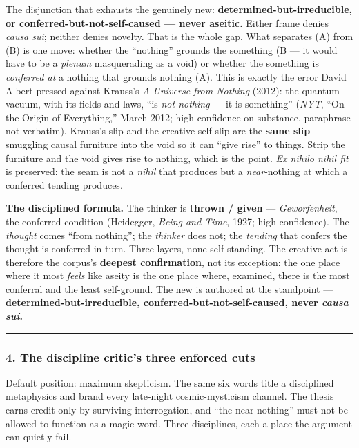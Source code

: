 \documentclass[11pt]{article}
\begin{document}
The disjunction that exhausts the genuinely new: \textbf{determined-but-irreducible, or conferred-but-not-self-caused — never aseitic.} Either frame denies \emph{causa sui}; neither denies novelty. That is the whole gap. What separates (A) from (B) is one move: whether the ``nothing'' grounds the something (B — it would have to be a \emph{plenum} masquerading as a void) or whether the something is \emph{conferred at} a nothing that grounds nothing (A). This is exactly the error David Albert pressed against Krauss's \emph{A Universe from Nothing} (2012): the quantum vacuum, with its fields and laws, ``is \emph{not nothing} — it is something'' (\emph{NYT}, ``On the Origin of Everything,'' March 2012; high confidence on substance, paraphrase not verbatim). Krauss's slip and the creative-self slip are the \textbf{same slip} — smuggling causal furniture into the void so it can ``give rise'' to things. Strip the furniture and the void gives rise to nothing, which is the point. \emph{Ex nihilo nihil fit} is preserved: the seam is not a \emph{nihil} that produces but a \emph{near}-nothing at which a conferred tending produces.

\textbf{The disciplined formula.} The thinker is \textbf{thrown /\allowbreak{} given} — \emph{Geworfenheit}, the conferred condition (Heidegger, \emph{Being and Time}, 1927; high confidence). The \emph{thought} comes ``from nothing''; the \emph{thinker} does not; the \emph{tending} that confers the thought is conferred in turn. Three layers, none self-standing. The creative act is therefore the corpus's \textbf{deepest confirmation}, not its exception: the one place where it most \emph{feels} like aseity is the one place where, examined, there is the most conferral and the least self-ground. The new is authored at the standpoint — \textbf{determined-but-irreducible, conferred-but-not-self-caused, never \emph{causa sui}.}

\medskip\noindent\rule{\linewidth}{0.3pt}\medskip

\subsubsection*{4. The discipline critic's three enforced cuts}

Default position: maximum skepticism. The same six words title a disciplined metaphysics and brand every late-night cosmic-mysticism channel. The thesis earns credit only by surviving interrogation, and ``the near-nothing'' must not be allowed to function as a magic word. Three disciplines, each a place the argument can quietly fail.
\end{document}
